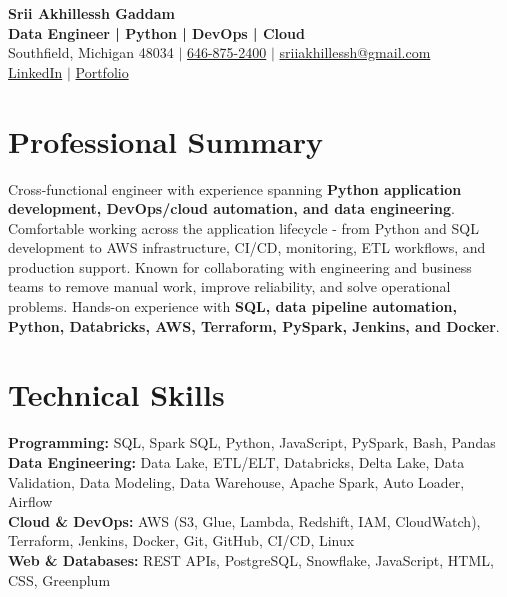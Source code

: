 \documentclass[letterpaper,10pt]{article}
\begin{document}
\fontsize{9.35pt}{10.45pt}\selectfont

\begin{center}
    {\LARGE \textbf{Srii Akhillessh Gaddam}} \\[-1pt]
    \textbf{Data Engineer | Python | DevOps | Cloud} \\[2pt]
    Southfield, Michigan 48034 $|$
    \href{tel:6468752400}{646-875-2400} $|$
    \href{mailto:sriiakhillessh@gmail.com}{sriiakhillessh@gmail.com} \\[1pt]
    \href{https://www.linkedin.com/in/srii-akhiilessh-gaddam-b48668191/}{LinkedIn} $|$
    \href{https://sriiakhillesshg.github.io/portfolio/}{Portfolio}
\end{center}
\vspace{-8pt}

\section{Professional Summary}
\small{Cross-functional engineer with experience spanning \textbf{Python application development, DevOps/cloud automation, and data engineering}. Comfortable working across the application lifecycle - from Python and SQL development to AWS infrastructure, CI/CD, monitoring, ETL workflows, and production support. Known for collaborating with engineering and business teams to remove manual work, improve reliability, and solve operational problems. Hands-on experience with \textbf{SQL, data pipeline automation, Python, Databricks, AWS, Terraform, PySpark, Jenkins, and Docker}.}

\section{Technical Skills}
\small{
\textbf{Programming:} SQL, Spark SQL, Python, JavaScript, PySpark, Bash, Pandas \\
\textbf{Data Engineering:} Data Lake, ETL/ELT, Databricks, Delta Lake, Data Validation, Data Modeling, Data Warehouse, Apache Spark, Auto Loader, Airflow \\
\textbf{Cloud \& DevOps:} AWS (S3, Glue, Lambda, Redshift, IAM, CloudWatch), Terraform, Jenkins, Docker, Git, GitHub, CI/CD, Linux \\
\textbf{Web \& Databases:} REST APIs, PostgreSQL, Snowflake, JavaScript, HTML, CSS, Greenplum
}
\end{document}
